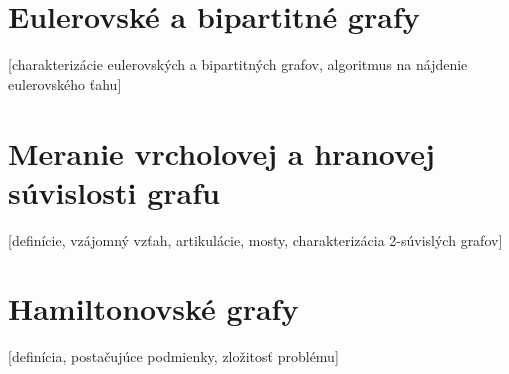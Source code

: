 \section {Eulerovské a bipartitné grafy}
  [charakterizácie eulerovských a bipartitných grafov, algoritmus na nájdenie eulerovského ťahu]

\section {Meranie vrcholovej a hranovej súvislosti grafu}
  [definície, vzájomný vzťah, artikulácie, mosty, charakterizácia 2-súvislých grafov] 

\section {Hamiltonovské grafy}
  [definícia, postačujúce podmienky, zložitosť problému] 
